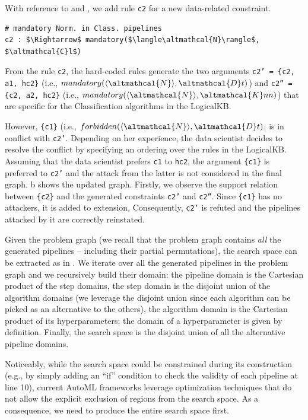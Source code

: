 \begin{example}
With reference to  and , we add rule \texttt{c2} for a new data-related constraint.
\begin{lstlisting}[mathescape=true]
# mandatory Norm. in Class. pipelines
c2 : $\Rightarrow$ mandatory($\langle\altmathcal{N}\rangle$, $\altmathcal{C}l$)
\end{lstlisting}
From the rule \texttt{c2}, the hard-coded rules generate the two arguments
\texttt{c2' = \{c2, a1, hc2\}} (i.e., $mandatory(\langle\altmathcal{N}\rangle, \altmathcal{D}t)$) and \texttt{c2'' = \{c2, a2, hc2\}} (i.e., $mandatory(\langle\altmathcal{N}\rangle, \altmathcal{K}nn)$) that are specific for the Classification algorithms in the LogicalKB.

However, \texttt{\{c1\}} (i.e., $forbidden(\langle\altmathcal{N}\rangle, \altmathcal{D}t)$; is in conflict with \texttt{c2'}.
Depending on her experience, the data scientist decides to resolve the conflict by specifying an ordering over the rules in the LogicalKB.
Assuming that the data scientist prefers \texttt{c1} to \texttt{hc2},
the argument \texttt{\{c1\}} is preferred to \texttt{c2'} and the attack from the latter is not considered in the final graph.
b shows the updated graph.
Firstly, we observe the support relation between \texttt{\{c2\}} and the generated constraints \texttt{c2'} and \texttt{c2''}.
Since \texttt{\{c1\}} has no attackers, it is added to extension.
Consequently, \texttt{c2'} is refuted and the pipelines attacked by it are correctly reinstated.
\label{ex:hard_coded_rules}
\end{example}

Given the problem graph (we recall that the problem graph contains \emph{all} the generated pipelines -- including their partial permutations), the search space can be extracted as in . 
We iterate over all the generated pipelines in the problem graph and we recursively build their domain: the pipeline domain is the Cartesian product of the step domains, the step domain is the disjoint union of the algorithm domains (we leverage the disjoint union since each algorithm can be picked as an alternative to the others), the algorithm domain is the Cartesian product of its hyperparameters; the domain of a hyperparameter is given by definition.
Finally, the search space is the disjoint union of all the alternative pipeline domains.

Noticeably, while the search space could be constrained during its construction (e.g., by simply adding an ``if'' condition to check the validity of each pipeline at  line 10), current AutoML frameworks leverage optimization techniques that do not allow the explicit exclusion of regions from the search space.
As a consequence, we need to produce the entire search space first.


